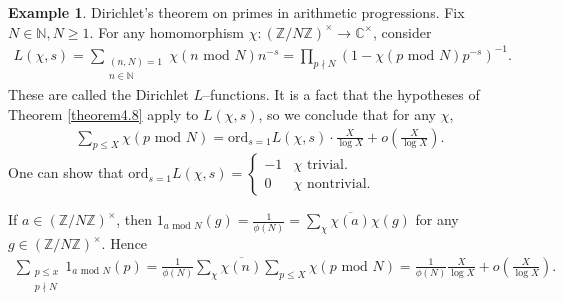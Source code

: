 \documentclass{article}
\theoremstyle{definition}
\newtheorem{example}{Example}[section]
\begin{document}
\begin{example}
    Dirichlet's theorem on primes in arithmetic progressions. Fix $N \in \mathbb{N}, N\ge 1$. For any homomorphism $\chi : (\mathbb{Z}/N\mathbb{Z})^\times \to \mathbb{C}^\times$, consider 
    \begin{align*}
        L(\chi, s) = \sum_{\substack{(n,N)=1\\n \in \mathbb{N}}}^{} \chi(n \text{ mod }N)n^{-s} = \prod_{p \nmid N}^{} (1 - \chi(p \text{ mod }N)p^{-s})^{-1}.
    \end{align*}
    These are called the Dirichlet $L$--functions. It is a fact that the hypotheses of Theorem \ref{theorem4.8} apply to $L(\chi, s)$, so we conclude that for any $\chi$, 
    \begin{align*}
        \sum_{p \le X}^{} \chi(p \text{ mod }N) = \text{ord}_{s=1} L(\chi, s) \cdot \frac{X}{\log X} + o \left(\frac{X}{\log X}\right).
    \end{align*}
    One can show that $\text{ord}_{s=1}L(\chi,s) = \begin{cases}
        -1 & \chi \text{ trivial}.\\
        0 & \chi \text{ nontrivial}.
    \end{cases}$ 
    \vspace{1mm}
     
    If $a \in (\mathbb{Z}/N\mathbb{Z})^\times$, then $1_{a \text{ mod }N}(g) = \frac{1}{\phi(N)} = \sum_{\chi}^{} \overline{\chi(a)}\chi(g)$ for any $g \in (\mathbb{Z}/N\mathbb{Z})^\times$. Hence
    \begin{align*}
        \sum_{\substack{p\le x\\p \nmid N}}^{} 1_{a \text{ mod }N}(p) = \frac{1}{\phi(N)} \sum_{\chi}^{} \overline{\chi(n)} \sum_{p\le X}^{} \chi(p \text{ mod }N) = \frac{1}{\phi(N)} \frac{X}{\log X} + o \left(\frac{X}{\log X}\right).
    \end{align*}
\end{example}

\end{document}
